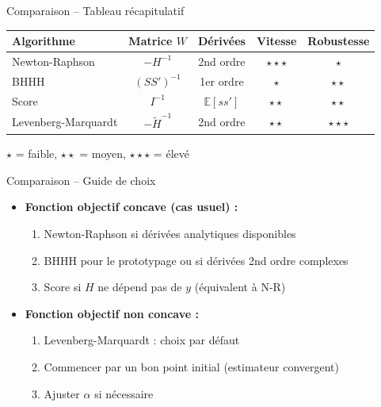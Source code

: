 \documentclass[11pt,aspectratio=169]{beamer}
\begin{document}
\begin{frame}{Comparaison -- Tableau récapitulatif}

\begin{center}
    \small
    \renewcommand{\arraystretch}{1.3}
    \begin{tabular}{lcccc}
        \toprule
        \textbf{Algorithme} & \textbf{Matrice $W$} & \textbf{Dérivées} & \textbf{Vitesse} & \textbf{Robustesse} \\
        \midrule
        Newton-Raphson & $-H^{-1}$ & 2nd ordre & $\star\star\star$ & $\star$ \\
        BHHH & $(SS')^{-1}$ & 1er ordre & $\star$ & $\star\star$ \\
        Score & $I^{-1}$ & $\mathbb{E}[ss']$ & $\star\star$ & $\star\star$ \\
        Levenberg-Marquardt & $-\tilde{H}^{-1}$ & 2nd ordre & $\star\star$ & $\star\star\star$ \\
        \bottomrule
    \end{tabular}
\end{center}

\vspace{0.5cm}

$\star$ = faible, $\star\star$ = moyen, $\star\star\star$ = élevé

\end{frame}

\begin{frame}{Comparaison -- Guide de choix}

\begin{itemize}

\item \textbf{Fonction objectif concave (cas usuel) :}
  \begin{enumerate}
    \item Newton-Raphson si dérivées analytiques disponibles\newline
    \item BHHH pour le prototypage ou si dérivées 2nd ordre complexes\newline
    \item Score si $H$ ne dépend pas de $y$ (équivalent à N-R)\newline
  \end{enumerate}

\item \textbf{Fonction objectif non concave :}
  \begin{enumerate}
    \item Levenberg-Marquardt : choix par défaut\newline
    \item Commencer par un bon point initial (estimateur convergent)\newline
    \item Ajuster $\alpha$ si nécessaire
  \end{enumerate}

\end{itemize}

\end{frame}
\end{document}
